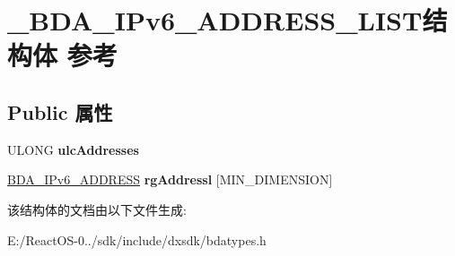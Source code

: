 \hypertarget{struct___b_d_a___i_pv6___a_d_d_r_e_s_s___l_i_s_t}{}\section{\+\_\+\+B\+D\+A\+\_\+\+I\+Pv6\+\_\+\+A\+D\+D\+R\+E\+S\+S\+\_\+\+L\+I\+S\+T结构体 参考}
\label{struct___b_d_a___i_pv6___a_d_d_r_e_s_s___l_i_s_t}
\subsection*{Public 属性}
\begin{DoxyCompactItemize}
\item 
\mbox{\label{struct___b_d_a___i_pv6___a_d_d_r_e_s_s___l_i_s_t_aa99e020e6989bb8212ab5325774c79e6}} 
U\+L\+O\+NG {\bfseries ulc\+Addresses}
\item 
\mbox{\label{struct___b_d_a___i_pv6___a_d_d_r_e_s_s___l_i_s_t_a7a707e4e63ebd5634976145f888231a0}} 
\hyperlink{struct___b_d_a___i_pv6___a_d_d_r_e_s_s}{B\+D\+A\+\_\+\+I\+Pv6\+\_\+\+A\+D\+D\+R\+E\+SS} {\bfseries rg\+Addressl} \mbox{[}M\+I\+N\+\_\+\+D\+I\+M\+E\+N\+S\+I\+ON\mbox{]}
\end{DoxyCompactItemize}


该结构体的文档由以下文件生成\+:\begin{DoxyCompactItemize}
\item 
E\+:/\+React\+O\+S-\/0../sdk/include/dxsdk/bdatypes.\+h\end{DoxyCompactItemize}
